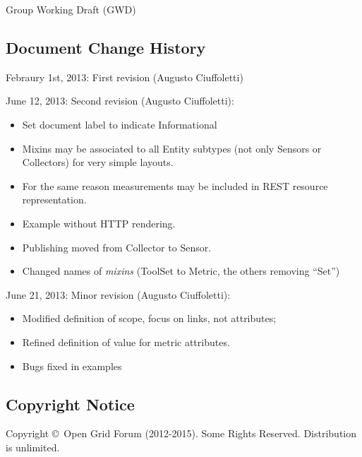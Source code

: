 \documentclass[10pt]{article}  %
\newcommand{\copyrightyears}{2012-2015}  %
\begin{document}
Group Working Draft (GWD)



\subsection*{Document Change History}

Febraury 1st, 2013: First revision (Augusto Ciuffoletti)

June 12, 2013: Second revision (Augusto Ciuffoletti):
\begin{itemize}
\item Set document label to indicate Informational
\item Mixins may be associated to all Entity subtypes (not only Sensors or Collectors) for very simple layouts. 
\item For the same reason measurements may be included in REST resource representation. 
\item Example without HTTP rendering. 
\item Publishing moved from Collector to Sensor.
\item Changed names of {\em mixins} (ToolSet to Metric, the others removing ``Set'')
\end{itemize}

June 21, 2013: Minor revision (Augusto Ciuffoletti):
\begin{itemize}
\item Modified definition of scope, focus on links, not attributes;
\item Refined definition of value for metric attributes.
\item Bugs fixed in examples
\end{itemize}

\subsection*{Copyright Notice}

Copyright \copyright \ Open Grid Forum (\copyrightyears).  Some Rights Reserved.  
Distribution is unlimited.
\end{document}

